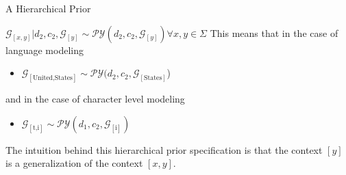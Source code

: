 \documentclass{beamer}
\newcommand{\G}{\mathcal{G}}
\newcommand{\PY}{\mathcal{P}\mathcal{Y}}
\begin{document}
\begin{frame}[t]{A Hierarchical Prior}
	\begin{block}	{$\G_{[x,y]} | d_2, c_2, \G_{[y]} \sim\PY(d_2, c_2, \G_{[y]} ) \forall x, y \in \Sigma $}
		This means that in the case of language modeling\\
		\begin{itemize}
			\item $\G_{[\textrm{United,States}]} \sim \PY(d_2, c_2,\G_{[\textrm{States}]}$)
		\end{itemize}
		and in the case of character level modeling 
		\begin{itemize}
			\item $\G_{[\textrm{t,i}]} \sim \PY(d_1, c_2, \G_{[\textrm{i}]})$
		\end{itemize}
		\vspace{.5cm}
		The intuition behind this hierarchical prior specification is that the context $[y]$ is a generalization of the context $[x,y]$.
	\end{block}
\end{frame}

%	
%	
%
%
%
%	
\end{document}
